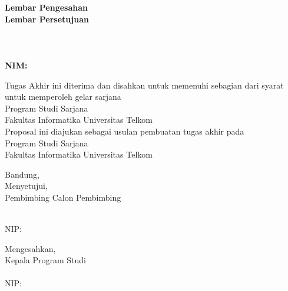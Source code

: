 {\centering
\iflogTA
\textbf{\large Lembar Pengesahan}\\  %
\else
\textbf{\large Lembar Persetujuan}\\
\fi
\vspace{0.5cm}
\textbf{\Title}\\
\vspace{0.5cm}
\textbf{\textit{\EngTitle}}\\
\vspace{0.5cm}
\textbf{\Author}\\
\textbf{NIM: \NIM}\\
\vspace{1cm}

\iflogTA 
{ Tugas Akhir ini diterima dan disahkan untuk memenuhi sebagian dari syarat untuk memperoleh gelar sarjana \Gelar\\ Program Studi Sarjana \Prodi\\ Fakultas Informatika Universitas Telkom}\\  %
\else
{ Proposal ini diajukan sebagai usulan pembuatan tugas akhir pada\\ Program Studi Sarjana \Prodi\\ Fakultas Informatika Universitas Telkom}\\
\fi
\vspace{0.5cm}

{Bandung, \Tanggal\quad \Bulan \quad \Date}\\
\vspace{0.5cm}
Menyetujui,\\
\iflogTA
Pembimbing
\else
Calon Pembimbing
\fi
\begin{center}
\vspace{2cm}
\underline{\PembimbingSatu} \\ 
NIP: \NIPPembimbingSatu
\end{center}
\vspace{0.5cm}
\iflogTA
Mengesahkan,\\   %
Kepala Program Studi \Prodi\\ %
\vspace{2.5cm}   %
\underline{\Kaprodi}\\ NIP: \NIPKaprodi\\  %
\fi
}